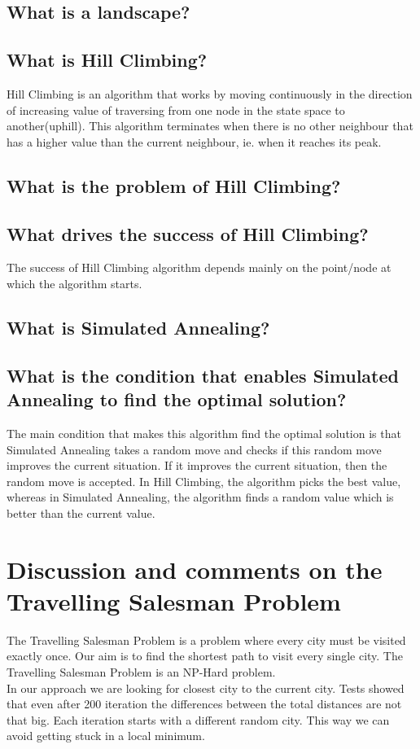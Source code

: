 \documentclass[11pt]{article}
\begin{document}
\subsection{What is a landscape?}
\subsection{What is Hill Climbing?}
Hill Climbing is an algorithm that works by moving continuously in the direction of increasing value of traversing from one node in the state space to another(uphill). This algorithm terminates when there is no other neighbour that has a higher value than the current neighbour, ie. when it reaches its peak.

\subsection{What is the problem of Hill Climbing?}
\subsection{What drives the success of Hill Climbing?}
The success of Hill Climbing algorithm depends mainly on the point/node at which the algorithm starts.

\subsection{What is Simulated Annealing?}
\subsection{What is the condition that enables Simulated Annealing to find
the optimal solution?}
The main condition that makes this algorithm find the optimal solution is that Simulated Annealing takes a random move and checks if this random move improves the current situation. If it improves the current situation, then the random move is accepted. In Hill Climbing, the algorithm picks the best value, whereas in Simulated Annealing, the algorithm finds a random value which is better than the current value. 

\newpage
\section{Discussion and comments on the Travelling Salesman Problem}
The Travelling Salesman Problem is a problem where every city must be visited exactly once. Our aim is to find the shortest path to visit every single city. The Travelling Salesman Problem is an NP-Hard problem. \\

In our approach we are looking for closest city to the current city. Tests showed that even after 200 iteration the differences between the total distances are not that big. Each iteration starts with a different random city. This way we can avoid getting stuck in a local minimum.
\end{document}
